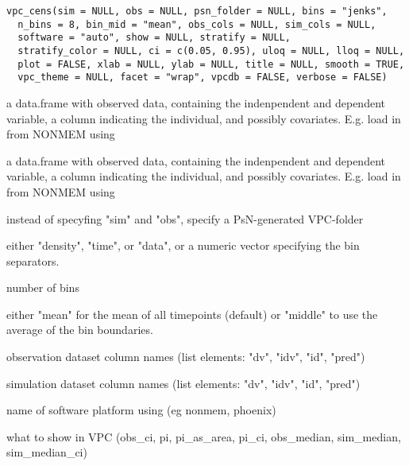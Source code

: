 \documentclass[letterpaper]{book}
\begin{document}
%
\begin{Usage}
\begin{verbatim}
vpc_cens(sim = NULL, obs = NULL, psn_folder = NULL, bins = "jenks",
  n_bins = 8, bin_mid = "mean", obs_cols = NULL, sim_cols = NULL,
  software = "auto", show = NULL, stratify = NULL,
  stratify_color = NULL, ci = c(0.05, 0.95), uloq = NULL, lloq = NULL,
  plot = FALSE, xlab = NULL, ylab = NULL, title = NULL, smooth = TRUE,
  vpc_theme = NULL, facet = "wrap", vpcdb = FALSE, verbose = FALSE)
\end{verbatim}
\end{Usage}
%
\begin{Arguments}
\begin{ldescription}
\item[\code{sim}] a data.frame with observed data, containing the indenpendent and dependent variable, a column indicating the individual, and possibly covariates. E.g. load in from NONMEM using 

\item[\code{obs}] a data.frame with observed data, containing the indenpendent and dependent variable, a column indicating the individual, and possibly covariates. E.g. load in from NONMEM using 

\item[\code{psn\_folder}] instead of specyfing "sim" and "obs", specify a PsN-generated VPC-folder

\item[\code{bins}] either "density", "time", or "data", or a numeric vector specifying the bin separators.

\item[\code{n\_bins}] number of bins

\item[\code{bin\_mid}] either "mean" for the mean of all timepoints (default) or "middle" to use the average of the bin boundaries.

\item[\code{obs\_cols}] observation dataset column names (list elements: "dv", "idv", "id", "pred")

\item[\code{sim\_cols}] simulation dataset column names (list elements: "dv", "idv", "id", "pred")

\item[\code{software}] name of software platform using (eg nonmem, phoenix)

\item[\code{show}] what to show in VPC (obs\_ci, pi, pi\_as\_area, pi\_ci, obs\_median, sim\_median, sim\_median\_ci)


\end{ldescription}
\end{Arguments}
\end{document}
